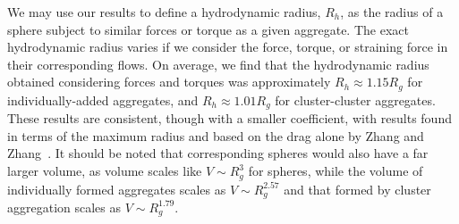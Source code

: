 \begin{table}[ht]
 \caption{Summary of results from section~\ref{sec:results} compared to corresponding results for a sphere. 
 }
 \label{table_sum}
 \end{table}


We may use our results to define a hydrodynamic radius, $R_h$, as the radius of a sphere subject to similar forces or torque as a given aggregate. The exact hydrodynamic radius varies if we consider the force, torque, or straining force in their corresponding flows. On average, we find that the hydrodynamic radius obtained considering forces and torques was approximately $R_h \approx 1.15 R_g$ for individually-added aggregates, and $R_h \approx 1.01 R_g$ for cluster-cluster aggregates. These results are consistent, though with a smaller coefficient, with results found in terms of the maximum radius and based on the drag alone by Zhang and Zhang~\cite{zhang_direct_2015}.
It should be noted that corresponding spheres would also have a far larger volume, as volume scales like $V \sim R_g^3$ for spheres, while the volume of individually formed aggregates scales as $V \sim R_g^{2.57}$ and that formed by cluster aggregation scales as $V \sim R_g^{1.79}$. 

